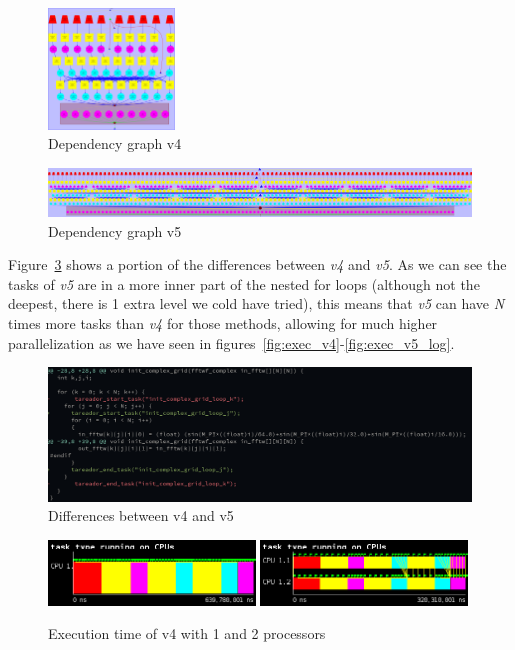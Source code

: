 \begin{figure}[H]%
    \centering
    \includegraphics[width=0.3\textwidth]{data/3dfft_/plots/dependency_graph_v4.pdf.png}
    \caption{Dependency graph v4}%
    \label{fig:depen_v4}
\end{figure}
\begin{figure}[H]%
    \centering
    \includegraphics[width=\textwidth]{data/3dfft_/plots/cap.png}
    \caption{Dependency graph v5}%
    \label{fig:depen_v5}
\end{figure}

Figure~\ref{fig:diff} shows a portion of the differences between \emph{v4} and \emph{v5}. As we can see
the tasks of \emph{v5} are in a more inner part of the nested for loops (although not the deepest, there is 1 extra level we cold have tried), this means that \emph{v5} can have \emph{N} times more tasks than \emph{v4} for those methods, allowing for much higher parallelization as we have seen in figures~\ref{fig:exec_v4}-\ref{fig:exec_v5_log}.

\begin{figure}[H]%
    \centering
    \includegraphics[width=\textwidth]{./data/3dfft_/plots/diff.png}
    \caption{Differences between v4 and v5}%
    \label{fig:diff}
\end{figure}

\begin{figure}[H]%
    \label{fig:plot_v4_01}
    \centering
    \includegraphics[width=0.49\textwidth]{./data/3dfft_/plots/v4_01.png}
    \includegraphics[width=0.49\textwidth]{./data/3dfft_/plots/v4_02.png}
    \caption{Execution time of v4 with 1 and 2 processors}%
\end{figure}

